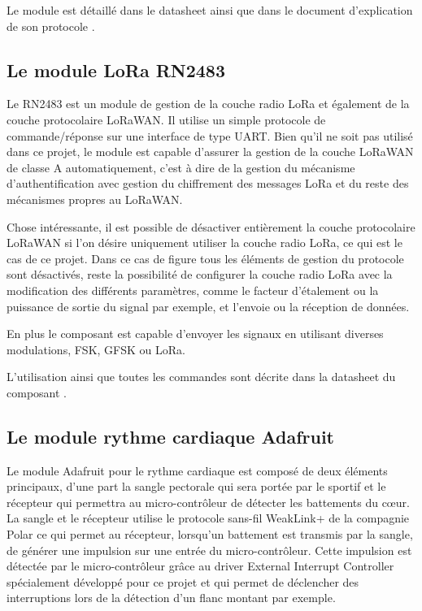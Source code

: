 Le module est détaillé dans le datasheet \cite{ublox-datasheet} ainsi que dans le document d'explication de son protocole \cite{ublox-protocol}.

\subsection{Le module LoRa RN2483}\label{ch:module_rn2483}


Le RN2483 est un module de gestion de la couche radio LoRa et également de la couche protocolaire LoRaWAN. Il utilise un simple protocole de commande/réponse sur une interface de type UART. Bien qu'il ne soit pas utilisé dans ce projet, le module est capable d'assurer la gestion de la couche LoRaWAN de classe A automatiquement, c'est à dire de la gestion du mécanisme d'authentification avec gestion du chiffrement des messages LoRa et du reste des mécanismes propres au LoRaWAN.

Chose intéressante, il est possible de désactiver entièrement la couche protocolaire LoRaWAN si l'on désire uniquement utiliser la couche radio LoRa, ce qui est le cas de ce projet. Dans ce cas de figure tous les éléments de gestion du protocole sont désactivés, reste la possibilité de configurer la couche radio LoRa avec la modification des différents paramètres, comme le facteur d'étalement ou la puissance de sortie du signal par exemple, et l'envoie ou la réception de données.

En plus le composant est capable d'envoyer les signaux en utilisant diverses modulations, FSK, GFSK ou LoRa.

L'utilisation ainsi que toutes les commandes sont décrite dans la datasheet du composant \cite{rn2483-datasheet}.

\subsection{Le module rythme cardiaque Adafruit}\label{ch:module_hr}

Le module Adafruit pour le rythme cardiaque est composé de deux éléments principaux, d'une part la sangle pectorale qui sera portée par le sportif et le récepteur qui permettra au micro-contrôleur de détecter les battements du cœur. La sangle et le récepteur utilise le protocole sans-fil WeakLink+ de la compagnie Polar ce qui permet au récepteur, lorsqu'un battement est transmis par la sangle, de générer une impulsion sur une entrée du micro-contrôleur. Cette impulsion est détectée par le micro-contrôleur grâce au driver External Interrupt Controller spécialement développé pour ce projet et qui permet de déclencher des interruptions lors de la détection d'un flanc montant par exemple.

